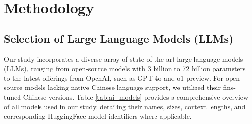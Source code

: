 \documentclass[conference]{IEEEtran}
\begin{document}
\section{Methodology}

\subsection{Selection of Large Language Models (LLMs)}

Our study incorporates a diverse array of state-of-the-art large language models (LLMs), ranging from open-source models with 3 billion to 72 billion parameters to the latest offerings from OpenAI, such as GPT-4o and o1-preview. For open-source models lacking native Chinese language support, we utilized their fine-tuned Chinese versions. Table \ref{tab:ai_models} provides a comprehensive overview of all models used in our study, detailing their names, sizes, context lengths, and corresponding HuggingFace model identifiers where applicable.
\end{document}
